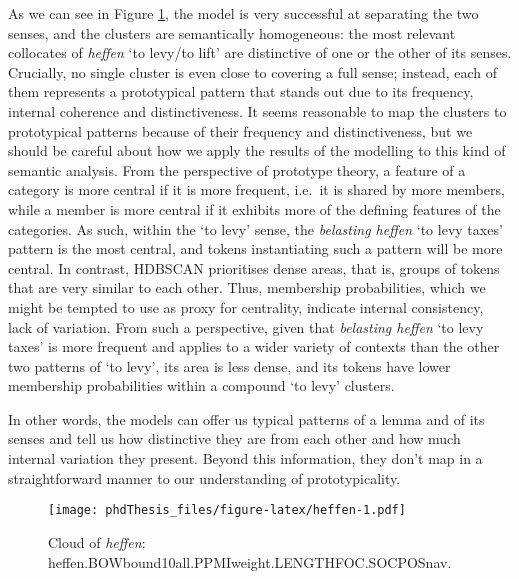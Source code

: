 \documentclass[
]{book}
\begin{document}
As we can see in Figure \ref{fig:heffen}, the model is very successful at separating the two senses, and the clusters are semantically homogeneous: the most relevant collocates of \emph{heffen} `to levy/to lift' are distinctive of one or the other of its senses. Crucially, no single cluster is even close to covering a full sense; instead, each of them represents a prototypical pattern that stands out due to its frequency, internal coherence and distinctiveness.
It seems reasonable to map the clusters to prototypical patterns because of their frequency and distinctiveness, but we should be careful about how we apply the results of the modelling to this kind of semantic analysis. From the perspective of prototype theory, a feature of a category is more central if it is more frequent, i.e.~it is shared by more members, while a member is more central if it exhibits more of the defining features of the categories. As such, within the `to levy' sense, the \emph{belasting heffen} `to levy taxes' pattern is the most central, and tokens instantiating such a pattern will be more central. In contrast, HDBSCAN prioritises dense areas, that is, groups of tokens that are very similar to each other. Thus, membership probabilities, which we might be tempted to use as proxy for centrality, indicate internal consistency, lack of variation. From such a perspective, given that \emph{belasting heffen} `to levy taxes' is more frequent and applies to a wider variety of contexts than the other two patterns of `to levy', its area is less dense, and its tokens have lower membership probabilities within a compound `to levy' clusters.

In other words, the models can offer us typical patterns of a lemma and of its senses and tell us how distinctive they are from each other and how much internal variation they present. Beyond this information, they don't map in a straightforward manner to our understanding of prototypicality.



\begin{figure}
\centering
\texttt{[image: phdThesis\_files/figure-latex/heffen-1.pdf]}
\caption{\label{fig:heffen}Cloud of \emph{heffen}: heffen.BOWbound10all.PPMIweight.LENGTHFOC.SOCPOSnav.}
\end{figure}
\end{document}
